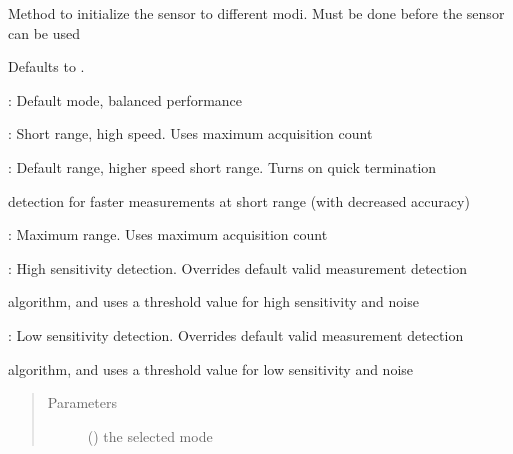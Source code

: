 \documentclass[letterpaper,10pt,english]{sphinxmanual}
\begin{document}
\begin{fulllineitems}

\begin{fulllineitems}
\label{\detokenize{sensor:lib.sensor.Sensor.configure}}
Method to initialize the sensor to different modi. Must be done before the sensor can be used

  Defaults to .

\begin{DUlineblock}{0em}
\item[] : Default mode, balanced performance
\item[] : Short range, high speed. Uses  maximum acquisition count
\item[] : Default range, higher speed short range. Turns on quick termination
\item[]
\begin{DUlineblock}{\DUlineblockindent}
\item[] detection for faster measurements at short range (with decreased accuracy)
\end{DUlineblock}
\item[] : Maximum range. Uses  maximum acquisition count
\item[] : High sensitivity detection. Overrides default valid measurement detection
\item[]
\begin{DUlineblock}{\DUlineblockindent}
\item[] algorithm, and uses a threshold value for high sensitivity and noise
\end{DUlineblock}
\item[] : Low sensitivity detection. Overrides default valid measurement detection
\item[]
\begin{DUlineblock}{\DUlineblockindent}
\item[] algorithm, and uses a threshold value for low sensitivity and noise
\end{DUlineblock}
\end{DUlineblock}
\begin{quote}\begin{description}
\item[{Parameters}] \leavevmode
{} () \textendash{} the selected mode


\end{description}
\end{quote}
\end{fulllineitems}
\end{fulllineitems}
\end{document}
